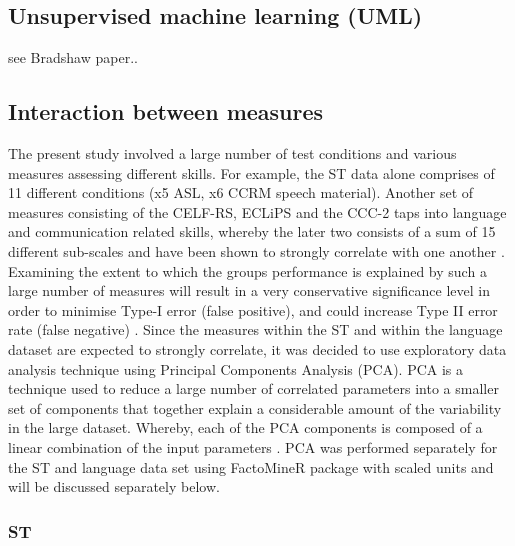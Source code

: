 \documentclass[a4paper, twoside]{templates/ociamthesis}
\begin{document}
\hypertarget{unsupervised-machine-learning-uml}{%
\subsection{Unsupervised machine learning (UML)}\label{unsupervised-machine-learning-uml}}

see Bradshaw paper..

\hypertarget{interaction-between-measures}{%
\subsection{Interaction between measures}\label{interaction-between-measures}}

The present study involved a large number of test conditions and various measures assessing different skills. For example, the ST data alone comprises of 11 different conditions (x5 ASL, x6 CCRM speech material). Another set of measures consisting of the CELF-RS, ECLiPS and the CCC-2 taps into language and communication related skills, whereby the later two consists of a sum of 15 different sub-scales and have been shown to strongly correlate with one another \autocite{Barry2014}. Examining the extent to which the groups performance is explained by such a large number of measures will result in a very conservative significance level in order to minimise Type-I error (false positive), and could increase Type II error rate (false negative) \autocite{McDonald2014}. Since the measures within the ST and within the language dataset are expected to strongly correlate, it was decided to use exploratory data analysis technique using Principal Components Analysis (PCA). PCA is a technique used to reduce a large number of correlated parameters into a smaller set of components that together explain a considerable amount of the variability in the large dataset. Whereby, each of the PCA components is composed of a linear combination of the input parameters \autocite{JamesGareth2013}. PCA was performed separately for the ST and language data set using FactoMineR package \autocite{Le2008} with scaled units and will be discussed separately below.

\hypertarget{st-1}{%
\subsubsection{ST}\label{st-1}}
\end{document}
